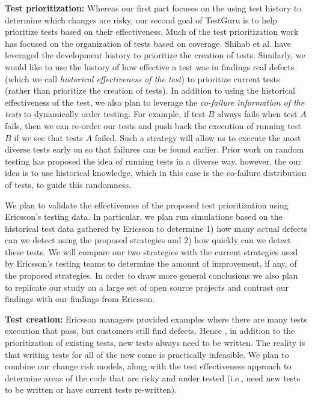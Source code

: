 \textbf{Test prioritization:} Whereas our first part focuses on the using test history to determine which changes are risky, our second goal of TestGuru is to help prioritize tests based on their effectiveness. Much of the test prioritization work  has focused on the organization of tests based on coverage.  Shihab et al. have leveraged the development history to prioritize the creation of tests. Similarly, we would like to use the history of how effective a test was in findings real defects (which we call \emph{historical effectiveness of the test}) to prioritize current tests (rather than prioritize the creation of tests). In addition to using the historical effectiveness of the test, we also plan to leverage the \emph{co-failure information of the tests} to dynamically order testing. For example, if test $B$ always fails when test $A$ fails, then we can re-order our tests and push back the execution of running test $B$ if we see that tests $A$ failed. Such a strategy will allow us to execute the most diverse tests early on so that failures can be found earlier. Prior work on random testing  has proposed the idea of running tests in a diverse way, however, the our idea is to use historical knowledge, which in this case is the co-failure distribution of tests, to guide this randomness. 

We plan to validate the effectiveness of the proposed test prioritization using Ericsson's testing data. In particular, we plan run simulations based on the historical test data gathered by Ericsson to determine 1) how many actual defects can we detect using the proposed strategies and 2) how quickly can we detect these tests. We will compare our two strategies with the current strategies used by Ericsson's testing teams to determine the amount of improvement, if any, of the proposed strategies. In order to draw more general conclusions we also plan to replicate our study on a large set of open source projects and contrast our findings with our findings from Ericsson. 


\textbf{Test creation:} Ericsson managers provided examples where there are many tests execution that pass, but customers still find defects. Hence , in addition to the prioritization of existing tests, new tests always need to be written. The reality is that writing tests for all of the new come is practically infeasible. We plan to combine our change risk models, along with the test effectiveness approach to determine areas of the code that are risky and under tested (i.e., need new tests to be written or have current tests re-written).



